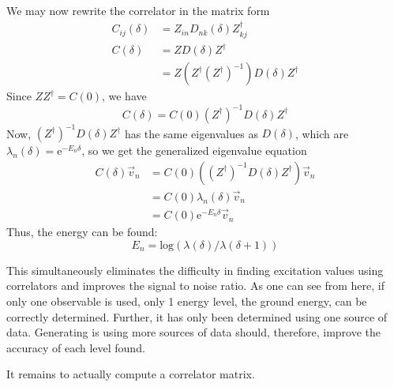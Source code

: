 \documentclass[a4paper,12pt]{report}
\renewcommand{\exp}[1]{\ensuremath{\textrm{e}^{ #1 }}}
\renewcommand{\log}[1]{\ensuremath{\textrm{log}\left( #1 \right)}}
\begin{document}
We may now rewrite the correlator in the matrix form
%
\begin{align}
C_{ij}(\delta) 		&= Z_{in} D_{nk}(\delta) Z^\dagger_{kj}\\
C(\delta) 	&= Z D(\delta) Z^\dagger\\
			&= Z (Z^\dagger (Z^\dagger)^{-1}) D(\delta) Z^\dagger
\end{align}
%
Since $Z Z^\dagger = C(0)$, we have
%
\begin{equation}
C(\delta) = C(0) (Z^\dagger)^{-1} D(\delta) Z^\dagger
\end{equation}
%
Now, $(Z^\dagger)^{-1} D(\delta) Z^\dagger$ has the same eigenvalues as $D(\delta)$, which are $\lambda_n(\delta) = \exp{-E_n \delta}$, so we get the generalized eigenvalue equation
%
\begin{align}
C(\delta)\vec{v}_n 	&= C(0) ((Z^\dagger)^{-1} D(\delta) Z^\dagger) \vec{v}_n\\
			&= C(0) \lambda_n(\delta) \vec{v}_n\\
			&= C(0) \exp{-E_n \delta} \vec{v}_n
\end{align}
%
Thus, the energy can be found:
%
\begin{equation}
E_n = \log{\lambda(\delta)/\lambda(\delta+1)}
\end{equation}

This simultaneously eliminates the difficulty in finding excitation values using correlators and improves the signal to noise ratio.
As one can see from here, if only one observable is used, only 1 energy level, the ground energy, can be correctly determined.
Further, it has only been determined using one source of data.
Generating is using more sources of data should, therefore, improve the accuracy of each level found.

It remains to actually compute a correlator matrix.
\end{document}

